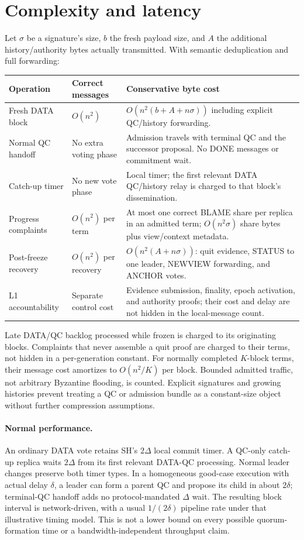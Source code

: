 \documentclass[11pt,a4paper]{article}
\newcounter{protocol}
\begin{document}
\section{Complexity and latency}
\label{sec:complexity}
Let $\sigma$ be a signature's size, $b$ the fresh payload size, and $A$
the additional history/authority bytes actually transmitted. With semantic
deduplication and full forwarding:
\begin{center}\small
\begin{tabularx}{\linewidth}{@{}>{\raggedright\arraybackslash}p{.21\linewidth}>{\raggedright\arraybackslash}p{.18\linewidth}Y@{}}
\toprule
Operation & Correct messages & Conservative byte cost\\
\midrule
Fresh DATA block & $O(n^2)$ &
$O(n^2(b+A+n\sigma))$ including explicit QC/history forwarding.\\
Normal QC handoff & No extra voting phase &
Admission travels with terminal QC and the successor proposal. No DONE
messages or commitment wait.\\
Catch-up timer & No new vote phase &
Local timer; the first relevant DATA QC/history relay is charged to
that block's dissemination.\\
Progress complaints & $O(n^2)$ per term &
At most one correct BLAME share per replica in an admitted term;
$O(n^2\sigma)$ share bytes plus view/context metadata.\\
Post-freeze recovery & $O(n^2)$ per recovery &
$O(n^2(A+n\sigma))$: quit evidence, STATUS to one leader, NEWVIEW
forwarding, and ANCHOR votes.\\
L1 accountability & Separate control cost &
Evidence submission, finality, epoch activation, and authority proofs;
their cost and delay are not hidden in the local-message count.\\
\bottomrule
\end{tabularx}
\end{center}
Late DATA/QC backlog processed while frozen is charged to its originating
blocks. Complaints that never assemble a quit proof are charged to their
terms, not hidden in a per-generation constant. For normally completed
$K$-block terms, their message cost amortizes to $O(n^2/K)$ per block.
Bounded admitted traffic, not arbitrary Byzantine flooding, is
counted. Explicit signatures and growing histories prevent treating a
QC or admission bundle as a constant-size object without further
compression assumptions.

\paragraph{Normal performance.}
An ordinary DATA vote retains SH's $2\Delta$ local commit timer.
A QC-only catch-up replica waits $2\Delta$ from its first relevant
DATA-QC processing. Normal leader changes preserve both timer types.
In a homogeneous good-case execution with actual delay $\delta$, a leader
can form a parent QC and propose its child in about $2\delta$; terminal-QC
handoff adds no protocol-mandated $\Delta$ wait. The resulting block
interval is network-driven, with a usual $1/(2\delta)$ pipeline rate
under that illustrative timing model. This is not a lower bound on every
possible quorum-formation time or a bandwidth-independent throughput claim.
\end{document}
